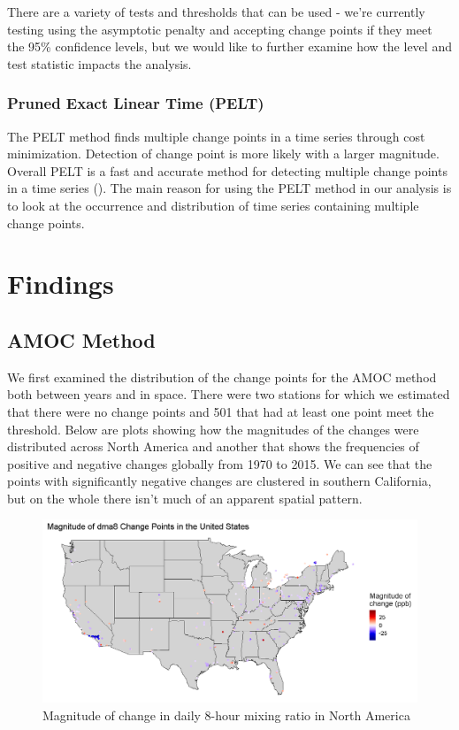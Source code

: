 \documentclass[11pt, oneside]{article}
\theoremstyle{definition}
\begin{document}
There are a variety of tests and thresholds that can be used - we're currently testing using the asymptotic penalty and accepting change points if they meet the 95\% confidence levels, but we would like to further examine how the level and test statistic impacts the analysis.

\subsubsection{Pruned Exact Linear Time (PELT)}
The PELT method finds multiple change points in a time series through cost minimization. Detection of change point is more likely with a larger magnitude. Overall PELT is a fast and accurate method for detecting multiple change points in a time series (\cite{pelt}). The main reason for using the PELT method in our analysis is to look at the occurrence and distribution of time series containing multiple change points. 

\section{Findings}
\subsection{AMOC Method}
We first examined the distribution of the change points for the AMOC method both between years and in space. There were two stations for which we estimated that there were no change points and 501 that had at least one point meet the threshold. Below are plots showing how the magnitudes of the changes were distributed across North America and another that shows the frequencies of positive and negative changes globally from 1970 to 2015. We can see that the points with significantly negative changes are clustered in southern California, but on the whole there isn't much of an apparent spatial pattern. 
 
\begin{figure}[H]
    \centering
    \includegraphics[width=0.75\linewidth]{plots/amoc_na_magnitude_pretty.png}
    \caption{Magnitude of change in daily 8-hour mixing ratio in North America}
    \label{dma8_na}
\end{figure}
\end{document}

